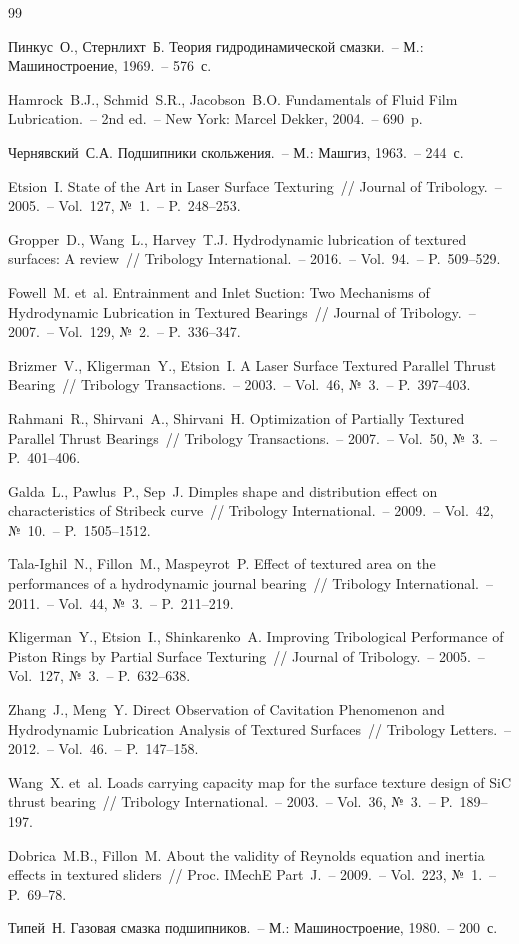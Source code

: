 \begin{thebibliography}{99}
{}

Пинкус~О., Стернлихт~Б. Теория гидродинамической смазки.~-- М.: Машиностроение, 1969.~-- 576~с.

Hamrock~B.J., Schmid~S.R., Jacobson~B.O. Fundamentals of Fluid Film Lubrication.~-- 2nd ed.~-- New York: Marcel Dekker, 2004.~-- 690~p.

Чернявский~С.А. Подшипники скольжения.~-- М.: Машгиз, 1963.~-- 244~с.

Etsion~I. State of the Art in Laser Surface Texturing~// Journal of Tribology.~-- 2005.~-- Vol.~127, №~1.~-- P.~248--253.

Gropper~D., Wang~L., Harvey~T.J. Hydrodynamic lubrication of textured surfaces: A review~// Tribology International.~-- 2016.~-- Vol.~94.~-- P.~509--529.

Fowell~M. et~al. Entrainment and Inlet Suction: Two Mechanisms of Hydrodynamic Lubrication in Textured Bearings~// Journal of Tribology.~-- 2007.~-- Vol.~129, №~2.~-- P.~336--347.

Brizmer~V., Kligerman~Y., Etsion~I. A Laser Surface Textured Parallel Thrust Bearing~// Tribology Transactions.~-- 2003.~-- Vol.~46, №~3.~-- P.~397--403.

Rahmani~R., Shirvani~A., Shirvani~H. Optimization of Partially Textured Parallel Thrust Bearings~// Tribology Transactions.~-- 2007.~-- Vol.~50, №~3.~-- P.~401--406.

Galda~L., Pawlus~P., Sep~J. Dimples shape and distribution effect on characteristics of Stribeck curve~// Tribology International.~-- 2009.~-- Vol.~42, №~10.~-- P.~1505--1512.

Tala-Ighil~N., Fillon~M., Maspeyrot~P. Effect of textured area on the performances of a hydrodynamic journal bearing~// Tribology International.~-- 2011.~-- Vol.~44, №~3.~-- P.~211--219.

Kligerman~Y., Etsion~I., Shinkarenko~A. Improving Tribological Performance of Piston Rings by Partial Surface Texturing~// Journal of Tribology.~-- 2005.~-- Vol.~127, №~3.~-- P.~632--638.

Zhang~J., Meng~Y. Direct Observation of Cavitation Phenomenon and Hydrodynamic Lubrication Analysis of Textured Surfaces~// Tribology Letters.~-- 2012.~-- Vol.~46.~-- P.~147--158.

Wang~X. et~al. Loads carrying capacity map for the surface texture design of SiC thrust bearing~// Tribology International.~-- 2003.~-- Vol.~36, №~3.~-- P.~189--197.

Dobrica~M.B., Fillon~M. About the validity of Reynolds equation and inertia effects in textured sliders~// Proc. IMechE Part~J.~-- 2009.~-- Vol.~223, №~1.~-- P.~69--78.

Типей~Н. Газовая смазка подшипников.~-- М.: Машиностроение, 1980.~-- 200~с.

\end{thebibliography}

